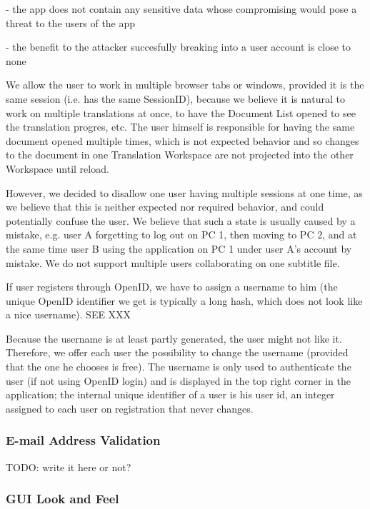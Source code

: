 - the app does not contain any sensitive data whose compromising would pose a threat to the users of the app

- the benefit to the attacker succesfully breaking into a user account is close to none


We allow the user to work in multiple browser tabs or windows, provided it is the same session (i.e. has the same SessionID), because we believe it is natural to work on multiple translations at once, to have the Document List opened to see the translation progres, etc. The user himself is responsible for having the same document opened multiple times, which is not expected behavior and so changes to the document in one Translation Workspace are not projected into the other Workspace until reload.

However, we decided to disallow one user having multiple sessions at one time, as we believe that this is neither expected nor required behavior, and could potentially confuse the user. We believe that such a state is usually caused by a mistake, e.g. user A forgetting to log out on PC 1, then moving to PC 2, and at the same time user B using the application on PC 1 under user A's account by mistake.
We do not support multiple users collaborating on one subtitle file.

If user registers through OpenID, we have to assign a username to him (the unique OpenID identifier we get is typically a long hash, which does not look like a nice username). SEE XXX

Because the username is at least partly generated, the user might not like it. Therefore, we offer each user the possibility to change the username (provided that the one he chooses is free). The username is only used to authenticate the user (if not using OpenID login) and is displayed in the top right corner in the application; the internal unique identifier of a user is his user id, an integer assigned to each user on registration that never changes.

\subsubsection{E-mail Address Validation}

TODO: write it here or not?

\subsubsection{GUI Look and Feel}


